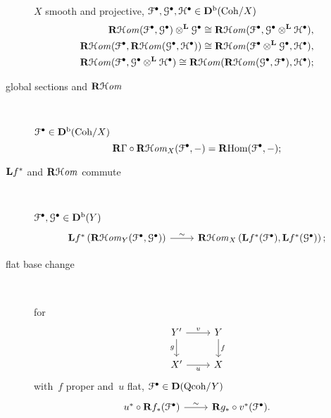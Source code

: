 \begin{description}
    $X$ smooth and projective, $\mathcal{F}^\bullet,\mathcal{G}^\bullet,\mathcal{H}^\bullet\in\mathbf{D}^{\mathrm{b}}(\mathrm{Coh}/X)$
    \begin{equation}
      \begin{aligned}
        \operatorname{\mathbf{R}\mathcal{H}\mathit{om}}(\mathcal{F}^\bullet,\mathcal{G}^\bullet)\otimes^{\mathbf{L}}\mathcal{G}^\bullet\cong\operatorname{\mathbf{R}\mathcal{H}\mathit{om}}(\mathcal{F}^\bullet,\mathcal{G}^\bullet\otimes^{\mathbf{L}}\mathcal{H}^\bullet), \\
        \operatorname{\mathbf{R}\mathcal{H}\mathit{om}}(\mathcal{F}^\bullet,\operatorname{\mathbf{R}\mathcal{H}\mathit{om}}(\mathcal{G}^\bullet,\mathcal{H}^\bullet))\cong\operatorname{\mathbf{R}\mathcal{H}\mathit{om}}(\mathcal{F}^\bullet\otimes^{\mathbf{L}}\mathcal{G}^\bullet,\mathcal{H}^\bullet), \\
        \operatorname{\mathbf{R}\mathcal{H}\mathit{om}}(\mathcal{F}^\bullet,\mathcal{G}^\bullet\otimes^{\mathbf{L}}\mathcal{H}^\bullet)\cong\operatorname{\mathbf{R}\mathcal{H}\mathit{om}}(\operatorname{\mathbf{R}\mathcal{H}\mathit{om}}(\mathcal{G}^\bullet,\mathcal{F}^\bullet),\mathcal{H}^\bullet);
      \end{aligned}
    \end{equation}

  \item[global sections and $\operatorname{\mathbf{R}\mathcal{H}\mathit{om}}$] {\ }
    
    $\mathcal{F}^\bullet\in\mathbf{D}^{\mathrm{b}}(\mathrm{Coh}/X)$
    \begin{equation}
      \mathbf{R}\Gamma\circ\operatorname{\mathbf{R}\mathcal{H}\mathit{om}}_X(\mathcal{F}^\bullet,-)=\operatorname{\mathbf{R}Hom}(\mathcal{F}^\bullet,-);
    \end{equation}

  \item[$\mathbf{L} f^*$ and $\operatorname{\mathbf{R}\mathcal{H}\mathit{om}}$ commute] {\ }
    
    $\mathcal{F}^\bullet,\mathcal{G}^\bullet\in\mathbf{D}^{\mathrm{b}}(Y)$
    \begin{equation}
      \begin{tikzcd}
        \LLL f^*\left( \RRRHHom_Y(\mathcal{F}^\bullet,\mathcal{G}^\bullet) \right) \arrow{r}{\sim} & \RRRHHom_X\left( \LLL f^*(\mathcal{F}^\bullet),\LLL f^*(\mathcal{G}^\bullet) \right);
      \end{tikzcd}
    \end{equation}

  \item[flat base change] {\ }

    for
    \begin{equation}
      \begin{tikzcd}
        Y' \arrow[swap]{d}{g} \arrow{r}{v} & Y \arrow{d}{f} \\
        X' \arrow[swap]{r}{u} & X
      \end{tikzcd}
    \end{equation}
    with~$f$ proper and~$u$ flat, $\mathcal{F}^\bullet\in\mathbf{D}(\mathrm{Qcoh}/Y)$
    \begin{equation}
      \begin{tikzcd}
        u^*\circ\RRR f_*(\mathcal{F}^\bullet) \arrow{r}{\sim} & \RRR g_*\circ v^*(\mathcal{F}^\bullet).
      \end{tikzcd}
    \end{equation}
\end{description}


